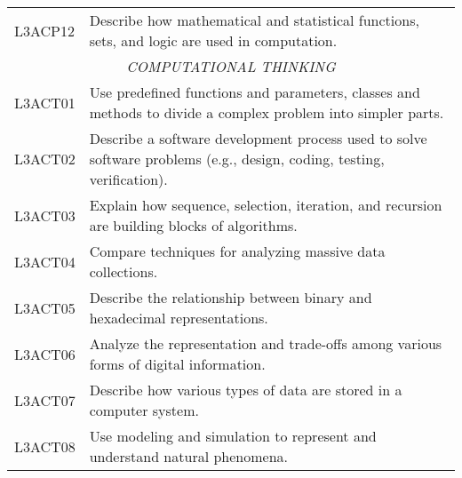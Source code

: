 \begin{longtable}{p{1.8cm}p{11cm}}
 L3ACP12 & Describe how mathematical and statistical functions, sets, and logic are used in computation.                                                                                                                              \\
 \multicolumn{2}{c}{\textit{COMPUTATIONAL THINKING}}                                                                                                                                                                                                     \\
 L3ACT01 & Use predefined functions and parameters, classes and methods to divide a complex problem into simpler parts.                                                                                                               \\
 L3ACT02 & Describe a software development process used to solve software problems (e.g., design, coding, testing, verification).                                                                                                     \\
 L3ACT03 & Explain how sequence, selection, iteration, and recursion are building blocks of algorithms.                                                                                                                               \\
 L3ACT04 & Compare techniques for analyzing massive data collections.                                                                                                                                                                 \\
 L3ACT05 & Describe the relationship between binary and hexadecimal representations.                                                                                                                                                  \\
 L3ACT06 & Analyze the representation and trade-offs among various forms of digital information.                                                                                                                                      \\
 L3ACT07 & Describe how various types of data are stored in a computer system.                                                                                                                                                        \\
 L3ACT08 & Use modeling and simulation to represent and understand natural phenomena.                                                                                                                                                 \\

\end{longtable}
